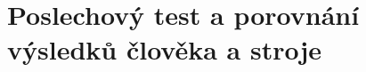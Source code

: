 \section{Poslechový test a porovnání výsledků člověka a stroje}
\label{chap:realisation:listening}






